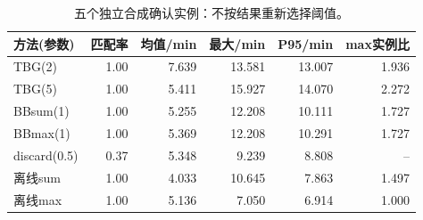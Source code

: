 \begin{table}[htbp]\centering\small
\caption{五个独立合成确认实例：不按结果重新选择阈值。}\label{tab:onlineconfirmation}
\begin{tabularx}{\linewidth}{Yrrrrr}\toprule
方法(参数) & 匹配率 & 均值/min & 最大/min & P95/min & max实例比\\\midrule
TBG(2) & 1.00 & 7.639 & 13.581 & 13.007 & 1.936\\
TBG(5) & 1.00 & 5.411 & 15.927 & 14.070 & 2.272\\
BBsum(1) & 1.00 & 5.255 & 12.208 & 10.111 & 1.727\\
BBmax(1) & 1.00 & 5.369 & 12.208 & 10.291 & 1.727\\
discard(0.5) & 0.37 & 5.348 & 9.239 & 8.808 & --\\
离线sum & 1.00 & 4.033 & 10.645 & 7.863 & 1.497\\
离线max & 1.00 & 5.136 & 7.050 & 6.914 & 1.000\\
\bottomrule\end{tabularx}
\end{table}
